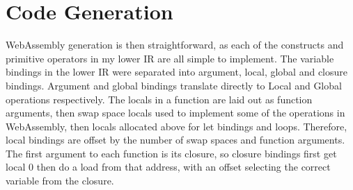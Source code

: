 


\section{Code Generation}
WebAssembly generation is then straightforward, as each of the constructs and primitive operators in my lower IR are all simple to implement. The variable bindings in the lower IR were separated into argument, local, global and closure bindings. Argument and global bindings translate directly to Local and Global operations respectively. The locals in a function are laid out as function arguments, then swap space locals used to implement some of the operations in WebAssembly, then locals allocated above for let bindings and loops. Therefore, local bindings are offset by the number of swap spaces and function arguments. The first argument to each function is its closure, so closure bindings first get local 0 then do a load from that address, with an offset selecting the correct variable from the closure. 

